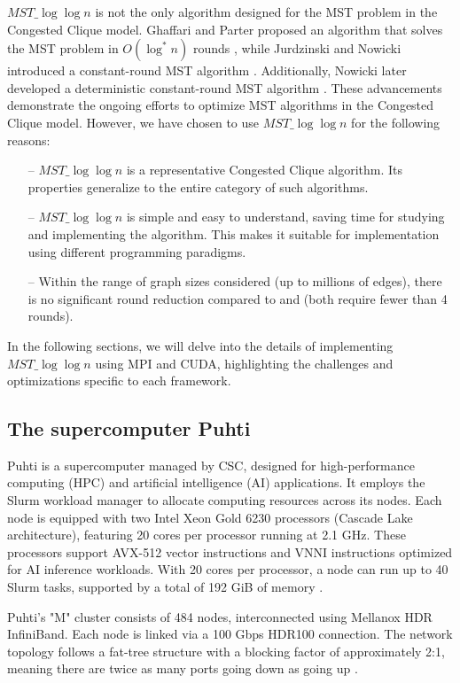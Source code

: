 \documentclass[english, 12pt, a4paper, elec, utf8, a-2b, online]{aaltothesis}
\newcommand{\mstalgo}{$MST\_\log\log{n}$}
\begin{document}
\mstalgo{} is not the only algorithm designed for the MST problem in the Congested Clique model. Ghaffari and Parter proposed an algorithm that solves the MST problem in \( O(\log^* n) \) rounds \cite{MSTLogStar}, while Jurdzinski and Nowicki introduced a constant-round MST algorithm \cite{MSTConstant}. Additionally, Nowicki later developed a deterministic constant-round MST algorithm \cite{MSTO1Rounds}. These advancements demonstrate the ongoing efforts to optimize MST algorithms in the Congested Clique model. However, we have chosen to use \mstalgo{} for the following reasons:

\begin{itemize}
	\item[--] \mstalgo{} is a representative Congested Clique algorithm. Its properties generalize to the entire category of such algorithms.
	\item[--] \mstalgo{} is simple and easy to understand, saving time for studying and implementing the algorithm. This makes it suitable for implementation using different programming paradigms.
	\item[--] Within the range of graph sizes considered (up to millions of edges), there is no significant round reduction compared to \cite{MSTLogStar} and \cite{MSTConstant} (both require fewer than 4 rounds).
\end{itemize}

In the following sections, we will delve into the details of implementing \mstalgo{} using MPI and CUDA, highlighting the challenges and optimizations specific to each framework.

\subsection{The supercomputer Puhti}
Puhti is a supercomputer managed by CSC, designed for high-performance computing (HPC) and artificial intelligence (AI) applications. It employs the Slurm workload manager \cite{Slurm} to allocate computing resources across its nodes. Each node is equipped with two Intel Xeon Gold 6230 processors (Cascade Lake architecture), featuring 20 cores per processor running at 2.1 GHz. These processors support AVX-512 vector instructions and VNNI instructions optimized for AI inference workloads. With 20 cores per processor, a node can run up to 40 Slurm tasks, supported by a total of 192 GiB of memory \cite{PuhtiDoc}.

Puhti's "M" cluster consists of 484 nodes, interconnected using Mellanox HDR InfiniBand. Each node is linked via a 100 Gbps HDR100 connection. The network topology follows a fat-tree structure with a blocking factor of approximately 2:1, meaning there are twice as many ports going down as going up \cite{PuhtiDoc} \cite{FatTrees}.
\end{document}
